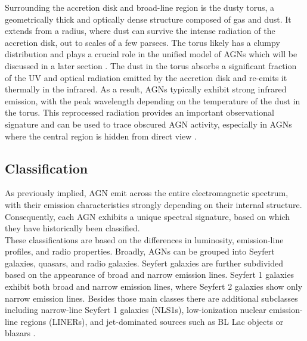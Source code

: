 Surrounding the accretion disk and broad-line region is the dusty torus, a geometrically thick and optically dense structure composed of gas and dust. It extends from a radius, where dust can survive the intense radiation of the accretion disk, out to scales of a few parsecs. The torus likely has a clumpy distribution and plays a crucial role in the unified model of AGNs which will be discussed in a later section \parencite{netzer2013agn,hickox2018obscured}.
The dust in the torus absorbs a significant fraction of the UV and optical radiation emitted by the accretion disk and re-emits it thermally in the infrared. As a result, AGNs typically exhibit strong infrared emission, with the peak wavelength depending on the temperature of the dust in the torus. This reprocessed radiation provides an important observational signature and can be used to trace obscured AGN activity, especially in AGNs where the central region is hidden from direct view \parencite{netzer2013agn}.



\subsection{Classification}
\label{sec:classification}
As previously implied, AGN emit across the entire electromagnetic spectrum, with their emission characteristics strongly depending on their internal structure. Consequently, each AGN exhibits a unique spectral signature, based on which they have historically been classified.\\
These classifications are based on the differences in luminosity, emission-line profiles, and radio properties. Broadly, AGNs can be grouped into Seyfert galaxies, quasars, and radio galaxies. Seyfert galaxies are further subdivided based on the appearance of broad and narrow emission lines. Seyfert 1 galaxies exhibit both broad and narrow emission lines, where Seyfert 2 galaxies show only narrow emission lines. Besides those main classes there are additional subclasses including narrow-line Seyfert 1 galaxies (NLS1s), low-ionization nuclear emission-line regions (LINERs), and jet-dominated sources such as BL Lac objects or blazars \parencite{antonucci1993unified, urry1995unified}.



